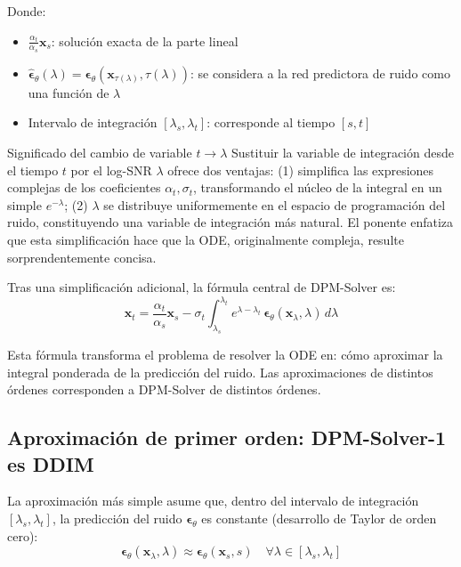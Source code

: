Donde:
\begin{itemize}
    \item $\frac{\alpha_t}{\alpha_s} \mathbf{x}_s$: solución exacta de la parte lineal
    \item $\hat{\boldsymbol{\epsilon}}_\theta(\lambda) = \boldsymbol{\epsilon}_\theta(\mathbf{x}_{\tau(\lambda)}, \tau(\lambda))$: se considera a la red predictora de ruido como una función de $\lambda$
    \item Intervalo de integración $[\lambda_s, \lambda_t]$: corresponde al tiempo $[s, t]$
\end{itemize}

\begin{knowledgebox}{Significado del cambio de variable $t \to \lambda$}
Sustituir la variable de integración desde el tiempo $t$ por el log-SNR $\lambda$ ofrece dos ventajas: (1) simplifica las expresiones complejas de los coeficientes $\alpha_t, \sigma_t$, transformando el núcleo de la integral en un simple $e^{-\lambda}$; (2) $\lambda$ se distribuye uniformemente en el espacio de programación del ruido, constituyendo una variable de integración más natural. El ponente enfatiza que esta simplificación hace que la ODE, originalmente compleja, resulte sorprendentemente concisa.
\end{knowledgebox}

Tras una simplificación adicional, la fórmula central de DPM-Solver es:
$$\mathbf{x}_t = \frac{\alpha_t}{\alpha_s} \mathbf{x}_s - \sigma_t \int_{\lambda_s}^{\lambda_t} e^{\lambda - \lambda_t}\, \boldsymbol{\epsilon}_\theta(\mathbf{x}_\lambda, \lambda)\, d\lambda$$

Esta fórmula transforma el problema de resolver la ODE en: cómo aproximar la integral ponderada de la predicción del ruido. Las aproximaciones de distintos órdenes corresponden a DPM-Solver de distintos órdenes.

\subsection{Aproximación de primer orden: DPM-Solver-1 es DDIM}

La aproximación más simple asume que, dentro del intervalo de integración $[\lambda_s, \lambda_t]$, la predicción del ruido $\boldsymbol{\epsilon}_\theta$ es constante (desarrollo de Taylor de orden cero):
$$\boldsymbol{\epsilon}_\theta(\mathbf{x}_\lambda, \lambda) \approx \boldsymbol{\epsilon}_\theta(\mathbf{x}_s, s) \quad \forall \lambda \in [\lambda_s, \lambda_t]$$

